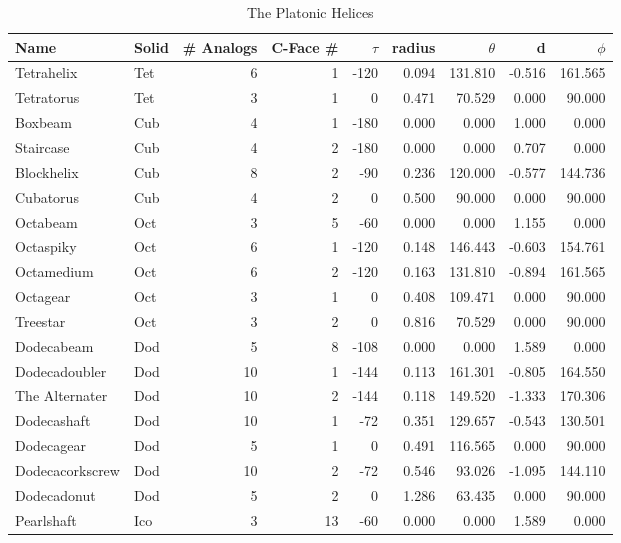 \documentclass[11pt]{article}
\begin{document}
{\begin{table}[ht]
\caption{The Platonic Helices} %
\centering %
\begin{tabular}{l l r r r r r r r}
  \hline\hline %
  Name & Solid & \# Analogs & C-Face \# & $ \tau $ & radius & $ \theta $ & d & $ \phi $ \\ [0.5ex] %
  \hline %
Tetrahelix & Tet &	6 &	1 &	-120 &	0.094 &	131.810	& -0.516 & 161.565 \\
Tetratorus & Tet & 	3 &	1 &	0    &	0.471 &	70.529	& 0.000	& 90.000 \\
\hline %
Boxbeam & Cub &	4 &	1 &	-180 &	0.000 &	0.000 &	1.000 &	0.000 \\
Staircase & Cub &	4 & 	2 &	-180 &	0.000 &	0.000 &	0.707 &	0.000 \\
Blockhelix & Cub & 	8 & 	2 & 	-90  &	0.236 &	120.000 & -0.577 & 144.736 \\
Cubatorus & Cub &	4 &	2 &	0 &	0.500 &	90.000 & 0.000 & 90.000 \\
\hline %
Octabeam & Oct &	3 &	5 &	-60 &	0.000 &	0.000 &	1.155 &	0.000 \\
Octaspiky & Oct &	6 &	1 &	-120 &	0.148 &	146.443 & -0.603 & 154.761 \\
Octamedium & Oct &	6 &	2 &	-120 &	0.163 &	131.810 & -0.894 & 161.565 \\
Octagear & Oct &	3 &	1 &	0 &	0.408 &	109.471 & 0.000	& 90.000 \\
Treestar & Oct &	3 &	2 &	0 &	0.816 &	70.529 & 0.000 & 90.000 \\
\hline %
Dodecabeam & Dod &	5 &	8 &	-108 &	0.000 &	0.000 &	1.589 &	0.000 \\
Dodecadoubler & Dod &	10 &	1 &	-144 &	0.113 &	161.301 &-0.805 & 164.550 \\
The Alternater & Dod &	10 &	2 &	-144 &	0.118 &	149.520 &-1.333	& 170.306 \\
Dodecashaft & Dod &	10 &	1 &	-72 &	0.351 &	129.657	&-0.543 & 130.501 \\
Dodecagear & Dod &	5 &	1 &	0 &	0.491 &	116.565	& 0.000	& 90.000 \\
Dodecacorkscrew & Dod &	10 &	2 &	-72 &	0.546 &	93.026 & -1.095 & 144.110 \\
Dodecadonut & Dod &	5 &	2 &	0 &	1.286 &	63.435 & 0.000 & 90.000 \\
\hline %
Pearlshaft & Ico &	3 &	13 &	-60 &	0.000 &	0.000 &	1.589 & 0.000 \\

\end{tabular}
\end{table}}
\end{document}
